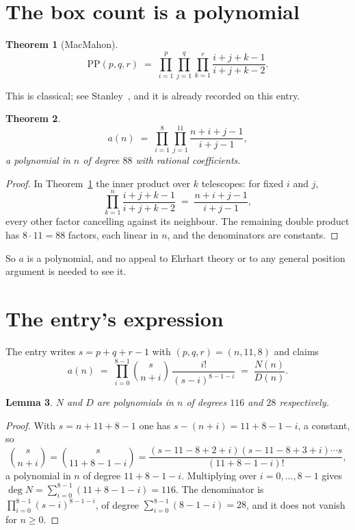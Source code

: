\documentclass[11pt,a4paper]{article}
\theoremstyle{plain}
\newtheorem{theorem}{Theorem}
\newtheorem{lemma}[theorem]{Lemma}
\theoremstyle{definition}
\begin{document}
\section{The box count is a polynomial}

\begin{theorem}[MacMahon]\label{thm:mm}
\[
\mathrm{PP}(p,q,r)\;=\;\prod_{i=1}^{p}\prod_{j=1}^{q}\prod_{k=1}^{r}
\frac{i+j+k-1}{i+j+k-2} .
\]
\end{theorem}

This is classical; see Stanley~\cite{stanley}, and it is already recorded on this entry.

\begin{theorem}\label{thm:poly}
\[
a(n)\;=\;\prod_{i=1}^{8}\prod_{j=1}^{11}\frac{n+i+j-1}{i+j-1},
\]
a polynomial in $n$ of degree $88$ with rational coefficients.
\end{theorem}

\begin{proof}
In Theorem~\ref{thm:mm} the inner product over $k$ telescopes: for fixed $i$ and $j$,
\[
\prod_{k=1}^{n}\frac{i+j+k-1}{i+j+k-2}\;=\;\frac{n+i+j-1}{i+j-1} ,
\]
every other factor cancelling against its neighbour. The remaining double product has
$8\cdot11=88$ factors, each linear in $n$, and the denominators are constants.
\end{proof}

So $a$ is a polynomial, and no appeal to Ehrhart theory or to any general position argument is
needed to see it.

\section{The entry's expression}

The entry writes $s=p+q+r-1$ with $(p,q,r)=(n,11,8)$ and claims
\[
a(n)\;=\;\prod_{i=0}^{8-1}\binom{s}{n+i}\,\frac{i!}{(s-i)^{8-1-i}}\;=\;
\frac{N(n)}{D(n)} .
\]

\begin{lemma}\label{lem:deg}
$N$ and $D$ are polynomials in $n$ of degrees $116$ and $28$ respectively.
\end{lemma}

\begin{proof}
With $s=n+11+8-1$ one has $s-(n+i)=11+8-1-i$, a constant, so
\[
\binom{s}{n+i}=\binom{s}{11+8-1-i}
=\frac{(s-11-8+2+i)(s-11-8+3+i)\cdots s}{(11+8-1-i)!},
\]
a polynomial in $n$ of degree $11+8-1-i$. Multiplying over $i=0,\dots,8-1$ gives
$\deg N=\sum_{i=0}^{8-1}(11+8-1-i)=116$. The denominator is
$\prod_{i=0}^{8-1}(s-i)^{8-1-i}$, of degree
$\sum_{i=0}^{8-1}(8-1-i)=28$, and it does not vanish for $n\ge0$.
\end{proof}
\end{document}
